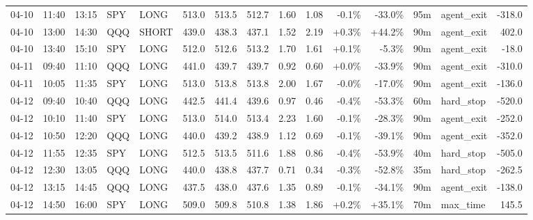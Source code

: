 \documentclass[11pt,a4paper,twoside]{article}
\begin{document}
\begin{landscape}
\begin{center}
\begin{longtable}{>{\color{txtmain}}l l l l l r r r r r r r r >{\color{txtmain}}l r}
04-10 & 11:40 & 13:15 & SPY & LONG & 513.0 & 513.5 & 512.7 & 1.60 & 1.08 & \textcolor{lossred}{-0.1\%} & \textcolor{lossred}{-33.0\%} & 95m & agent\_exit & \textcolor{lossred}{-318.0} \\
04-10 & 13:00 & 14:30 & QQQ & SHORT & 439.0 & 438.3 & 437.1 & 1.52 & 2.19 & \textcolor{wingreen}{+0.3\%} & \textcolor{wingreen}{+44.2\%} & 90m & agent\_exit & \textcolor{wingreen}{402.0} \\
04-10 & 13:40 & 15:10 & SPY & LONG & 512.0 & 512.6 & 513.2 & 1.70 & 1.61 & \textcolor{wingreen}{+0.1\%} & \textcolor{lossred}{-5.3\%} & 90m & agent\_exit & \textcolor{lossred}{-18.0} \\
04-11 & 09:40 & 11:10 & QQQ & LONG & 441.0 & 439.7 & 439.7 & 0.92 & 0.60 & \textcolor{wingreen}{+0.0\%} & \textcolor{lossred}{-33.9\%} & 90m & agent\_exit & \textcolor{lossred}{-310.0} \\
04-11 & 10:05 & 11:35 & SPY & LONG & 513.0 & 513.8 & 513.8 & 2.00 & 1.67 & \textcolor{lossred}{-0.0\%} & \textcolor{lossred}{-17.0\%} & 90m & agent\_exit & \textcolor{lossred}{-136.0} \\
04-12 & 09:40 & 10:40 & QQQ & LONG & 442.5 & 441.4 & 439.6 & 0.97 & 0.46 & \textcolor{lossred}{-0.4\%} & \textcolor{lossred}{-53.3\%} & 60m & hard\_stop & \textcolor{lossred}{-520.0} \\
04-12 & 10:10 & 11:40 & SPY & LONG & 513.0 & 514.0 & 513.4 & 2.23 & 1.60 & \textcolor{lossred}{-0.1\%} & \textcolor{lossred}{-28.3\%} & 90m & agent\_exit & \textcolor{lossred}{-252.0} \\
04-12 & 10:50 & 12:20 & QQQ & LONG & 440.0 & 439.2 & 438.9 & 1.12 & 0.69 & \textcolor{lossred}{-0.1\%} & \textcolor{lossred}{-39.1\%} & 90m & agent\_exit & \textcolor{lossred}{-352.0} \\
04-12 & 11:55 & 12:35 & SPY & LONG & 512.5 & 513.5 & 511.6 & 1.88 & 0.86 & \textcolor{lossred}{-0.4\%} & \textcolor{lossred}{-53.9\%} & 40m & hard\_stop & \textcolor{lossred}{-505.0} \\
04-12 & 12:30 & 13:05 & QQQ & LONG & 440.0 & 438.8 & 437.7 & 0.71 & 0.34 & \textcolor{lossred}{-0.3\%} & \textcolor{lossred}{-52.8\%} & 35m & hard\_stop & \textcolor{lossred}{-262.5} \\
04-12 & 13:15 & 14:45 & QQQ & LONG & 437.5 & 438.0 & 437.6 & 1.35 & 0.89 & \textcolor{lossred}{-0.1\%} & \textcolor{lossred}{-34.1\%} & 90m & agent\_exit & \textcolor{lossred}{-138.0} \\
04-12 & 14:50 & 16:00 & SPY & LONG & 509.0 & 509.8 & 510.8 & 1.38 & 1.86 & \textcolor{wingreen}{+0.2\%} & \textcolor{wingreen}{+35.1\%} & 70m & max\_time & \textcolor{wingreen}{145.5} \\

\end{longtable}
\end{center}
\end{landscape}
\end{document}
